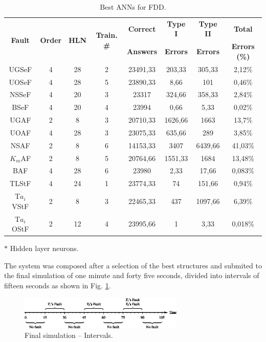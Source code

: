 \documentclass[10pt,fleqn,a4paper]{article}
\begin{document}
\begin{table}[htb]
\centering
\caption{Best ANNs for FDD.}
\label{tab:best_ann}
\begin{threeparttable}
\begin{tabular}{|c|c|c|c|c|c|c|c|}
\hline
\multirow{2}{*}{\bf Fault} &
\multirow{2}{*}{\bf Order} &
\multirow{2}{*}{{\bf HLN}\tnote{$*$}} &
\multirow{2}{*}{\bf Train. \#} &
{\bf Correct} & {\bf Type I} & {\bf Type II} & {\bf Total}\\
& & & & {\bf Answers} & {\bf Errors} & {\bf Errors} & {\bf Errors (\%)}\\
\hline
UGSeF & 4 & 28 & 2 & 23491,33 & 203,33 & 305,33 & 2,12\%\\
\hline
UOSeF & 4 & 28 & 5 & 23890,33 & 8,66 & 101 & 0,46\%\\
\hline
NSSeF & 4 & 20 & 3 & 23317 & 324,66 & 358,33 & 2,84\%\\
\hline
BSeF & 4 & 20 & 4 & 23994 & 0,66 & 5,33 & 0,02\%\\
\hline
UGAF & 2 & 8 & 3 & 20710,33 & 1626,66 & 1663 & 13,7\%\\
\hline
UOAF & 4 & 28 & 3 & 23075,33 & 635,66 & 289 & 3,85\%\\
\hline
{NSAF} & 2 & 8 & 6 & 14153,33 & 3407 & 6439,66 & 41,03\%\\
\hline
$K_m$AF & 2 & 8 & 5 & 20764,66 & 1551,33 & 1684 & 13,48\%\\
\hline
BAF & 4 & 28 & 6 & 23980 & 2,33 & 17,66 & 0,083\%\\
\hline
TLStF & 4 & 24 & 1 & 23774,33 & 74 & 151,66 & 0,94\%\\
\hline
T$a_i$VStF & 2 & 8 & 3 & 22465,33 & 437 & 1097,66 & 6,39\%\\
\hline
T$a_i$OStF & 2 & 12 & 4 & 23995,66 & 1 & 3,33 & 0,018\%\\
\hline
\end{tabular}
\begin{tablenotes}
\item [$*$] Hidden layer neurons.
\end{tablenotes}
\end{threeparttable}
\end{table}

The system was composed after a selection of the best structures and submited to
the final simulation of one minute and forty five seconds, divided into
intervals of fifteen seconds as shown in Fig. \ref{fig:intervals}.

\begin{figure}[htb]
\centering
    \includegraphics[width=0.7\textwidth]{imgs/intervals}
    \caption{Final simulation -- Intervals.}
    \label{fig:intervals}
\end{figure}
\end{document}

